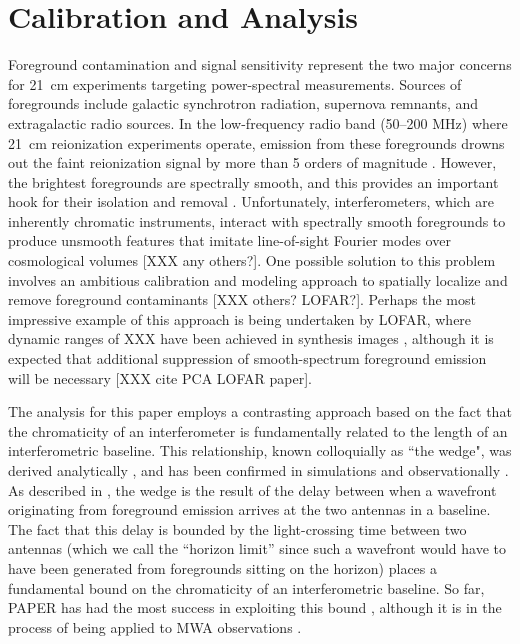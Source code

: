\documentclass[twocolumn,numberedappendix]{emulateapj} \shorttitle{PSA64}
\begin{document}
\section{Calibration and Analysis}\label{sec:analysis}

Foreground contamination and signal sensitivity represent the two major concerns for 21~cm
experiments targeting power-spectral measurements. Sources of foregrounds include
galactic synchrotron radiation, supernova remnants, and extragalactic radio sources.
In the low-frequency radio band (50--200 MHz) where 21~cm reionization experiments operate,
emission from these foregrounds
drowns out the faint reionization signal by more than 5 orders of magnitude
\citep{deoliveira2008,jelic_et_al2008,santos_et_al2005}.
However, the brightest foregrounds are spectrally smooth, and this provides an important hook
for their isolation and removal \citep{liu_et_al2009,liu_tegmark2012}.  Unfortunately, interferometers, which are inherently chromatic
instruments, interact with spectrally smooth foregrounds to produce unsmooth features that
imitate line-of-sight Fourier modes over cosmological volumes \citep{bowman_et_al2009,morales_et_al2006a} [XXX any others?].
One possible solution to this problem involves an ambitious calibration and modeling approach to spatially localize and
remove foreground contaminants \citep{harker_et_al2009,liu_et_al2008,juddEarly} [XXX others? LOFAR?].  
Perhaps the most impressive example of this approach is being undertaken by LOFAR, where dynamic ranges of XXX have
been achieved in synthesis images \citep{yatawatta_et_al2013}, although it is expected that additional
suppression of smooth-spectrum foreground emission will be necessary [XXX cite PCA LOFAR paper].

The analysis for this paper employs a contrasting
approach based on the fact that the chromaticity of an interferometer
is fundamentally related to the length of an interferometric baseline.  This relationship, known
colloquially as ``the wedge", was 
derived analytically \citep{parsons_et_al2012b,vedantham_et_al2012}, and has been confirmed in 
simulations \citep{datta_et_al2010,hazelton_et_al2013} and observationally
\citep{pober_et_al2013,dillon_et_al2013b}.  As described in \citep{parsons_et_al2012b}, the wedge is the result of the delay
between when a wavefront originating from foreground emission
arrives at the two antennas in a baseline.  The fact that this delay is bounded by the light-crossing
time between two antennas (which we call the ``horizon limit'' since such a wavefront would have to have
been generated from foregrounds sitting on the horizon) places a fundamental bound on the chromaticity of
an interferometric baseline.  So far, PAPER has had the most success in exploiting this bound
\citep{parsons_et_al2014,jacobs_et_al2014}, although it is in the process of being applied to MWA
observations \citep{nitya}.  
\end{document}
